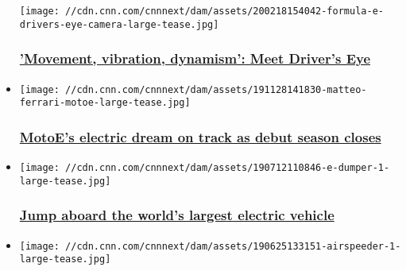 \begin{itemize}
  \texttt{[image: //cdn.cnn.com/cnnnext/dam/assets/200218154042-formula-e-drivers-eye-camera-large-tease.jpg]}

  \hypertarget{movement-vibration-dynamism-meet-drivers-eye}{%
  \subsubsection{\texorpdfstring{\href{/2020/02/19/motorsport/drivers-eye-camera-formula-e-supercharged-spt-intl/index.html}{'Movement,
  vibration, dynamism': Meet Driver's
  Eye}}{'Movement, vibration, dynamism': Meet Driver's Eye}}\label{movement-vibration-dynamism-meet-drivers-eye}}
\item
  \href{/2019/11/29/motorsport/motoe-debut-season-champion-matteo-ferrari-supercharged-spt-intl/index.html}{}

  \texttt{[image: //cdn.cnn.com/cnnnext/dam/assets/191128141830-matteo-ferrari-motoe-large-tease.jpg]}

  \hypertarget{motoes-electric-dream-on-track-as-debut-season-closes}{%
  \subsubsection{\texorpdfstring{\href{/2019/11/29/motorsport/motoe-debut-season-champion-matteo-ferrari-supercharged-spt-intl/index.html}{MotoE's
  electric dream on track as debut season
  closes}}{MotoE's electric dream on track as debut season closes}}\label{motoes-electric-dream-on-track-as-debut-season-closes}}
\item
  \href{/2019/07/16/sport/edumper-electric-vehicle-supercharged-spt-intl/index.html}{}

  \texttt{[image: //cdn.cnn.com/cnnnext/dam/assets/190712110846-e-dumper-1-large-tease.jpg]}

  \hypertarget{jump-aboard-the-worlds-largest-electric-vehicle}{%
  \subsubsection{\texorpdfstring{\href{/2019/07/16/sport/edumper-electric-vehicle-supercharged-spt-intl/index.html}{Jump
  aboard the world's largest electric
  vehicle}}{Jump aboard the world's largest electric vehicle}}\label{jump-aboard-the-worlds-largest-electric-vehicle}}
\item
  \href{/2019/06/26/sport/airspeeder-drone-racing-alauna-supercharged-spt-intl/index.html}{}

  \texttt{[image: //cdn.cnn.com/cnnnext/dam/assets/190625133151-airspeeder-1-large-tease.jpg]}


\end{itemize}

